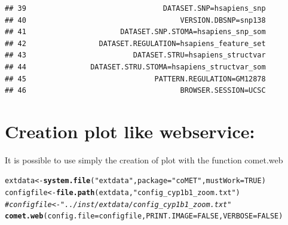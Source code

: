 \documentclass[11pt]{article}\usepackage[]{graphicx}\usepackage[usenames,dvipsnames]{color}
\makeatletter
\newcommand{\hlnum}[1]{\textcolor[rgb]{0.686,0.059,0.569}{#1}}%
\newcommand{\hlstr}[1]{\textcolor[rgb]{0.192,0.494,0.8}{#1}}%
\newcommand{\hlcom}[1]{\textcolor[rgb]{0.678,0.584,0.686}{\textit{#1}}}%
\newcommand{\hlstd}[1]{\textcolor[rgb]{0.345,0.345,0.345}{#1}}%
\newcommand{\hlkwb}[1]{\textcolor[rgb]{0.69,0.353,0.396}{#1}}%
\newcommand{\hlkwc}[1]{\textcolor[rgb]{0.333,0.667,0.333}{#1}}%
\newcommand{\hlkwd}[1]{\textcolor[rgb]{0.737,0.353,0.396}{\textbf{#1}}}%
\newenvironment{kframe}{%
 \def\at@end@of@kframe{}%
 \ifinner\ifhmode%
  \def\at@end@of@kframe{\end{minipage}}%
  \begin{minipage}{\columnwidth}%
 \fi\fi%
 \def\FrameCommand##1{\hskip\@totalleftmargin \hskip-\fboxsep
 \colorbox{shadecolor}{##1}\hskip-\fboxsep
     \hskip-\linewidth \hskip-\@totalleftmargin \hskip\columnwidth}%
 \MakeFramed {\advance\hsize-\width
   \@totalleftmargin\z@ \linewidth\hsize
   \@setminipage}}%
 {\par\unskip\endMakeFramed%
 \at@end@of@kframe}
\newenvironment{knitrout}{}{} %
\makeatother
\begin{document}
\begin{knitrout}
\begin{kframe}
\begin{verbatim}
## 39                                DATASET.SNP=hsapiens_snp
## 40                                    VERSION.DBSNP=snp138
## 41                      DATASET.SNP.STOMA=hsapiens_snp_som
## 42                 DATASET.REGULATION=hsapiens_feature_set
## 43                         DATASET.STRU=hsapiens_structvar
## 44               DATASET.STRU.STOMA=hsapiens_structvar_som
## 45                              PATTERN.REGULATION=GM12878
## 46                                    BROWSER.SESSION=UCSC
\end{verbatim}
\end{kframe}
\end{knitrout}

\section{Creation plot like webservice:}
It is possible to use simply the creation of plot with the function comet.web

\begin{knitrout}
\color{fgcolor}\begin{kframe}
\begin{alltt}
\hlstd{extdata} \hlkwb{<-} \hlkwd{system.file}\hlstd{(}\hlstr{"extdata"}\hlstd{,} \hlkwc{package}\hlstd{=}\hlstr{"coMET"}\hlstd{,}\hlkwc{mustWork}\hlstd{=}\hlnum{TRUE}\hlstd{)}
\hlstd{configfile} \hlkwb{<-} \hlkwd{file.path}\hlstd{(extdata,} \hlstr{"config_cyp1b1_zoom.txt"}\hlstd{)}
\hlcom{#configfile <- "../inst/extdata/config_cyp1b1_zoom.txt" }
\hlkwd{comet.web}\hlstd{(}\hlkwc{config.file}\hlstd{=configfile,}\hlkwc{PRINT.IMAGE}\hlstd{=}\hlnum{FALSE}\hlstd{,}\hlkwc{VERBOSE}\hlstd{=}\hlnum{FALSE}\hlstd{)}
\end{alltt}
\end{kframe}
\end{knitrout}
\end{document}
